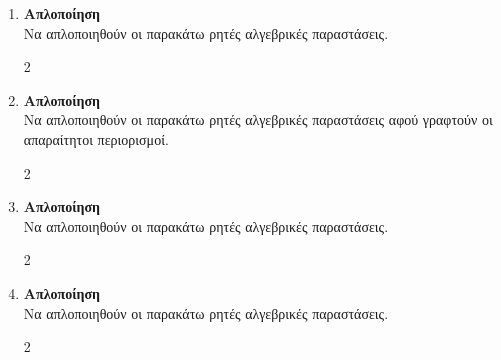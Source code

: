 \documentclass[11pt,a4paper,modern]{FFExercises}
\begin{document}
\begin{enumerate}[resume]
\item \textbf{Απλοποίηση}\\
Να απλοποιηθούν οι παρακάτω ρητές αλγεβρικές παραστάσεις.
\begin{multicols}{2}
\end{multicols}

\item \textbf{Απλοποίηση}\\
Να απλοποιηθούν οι παρακάτω ρητές αλγεβρικές παραστάσεις αφού γραφτούν οι απαραίτητοι περιορισμοί.
\begin{multicols}{2}
\end{multicols}

\item \textbf{Απλοποίηση}\\
Να απλοποιηθούν οι παρακάτω ρητές αλγεβρικές παραστάσεις.
\begin{multicols}{2}
\end{multicols}

\item \textbf{Απλοποίηση}\\
Να απλοποιηθούν οι παρακάτω ρητές αλγεβρικές παραστάσεις.
\begin{multicols}{2}
\end{multicols}


\end{enumerate}
\end{document}
